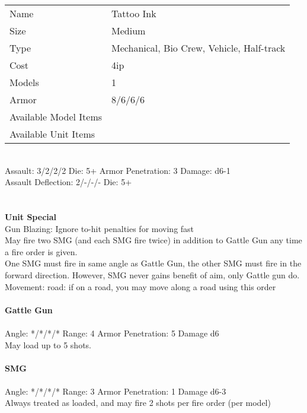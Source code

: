 \begin{tabular}{ll}
  Name & Tattoo Ink \\
  Size & Medium\\
  Type & Mechanical, Bio Crew, Vehicle, Half-track\\
  Cost & 4ip\\
  Models & 1\\
  Armor & 8/6/6/6\\
  Available Model Items &  \\
  Available Unit Items &  \\
\end{tabular}

\ \\
Assault: 3/2/2/2 Die: 5+ Armor Penetration: 3 Damage: d6-1 \\
Assault Deflection: 2/-/-/- Die: 5+\\
\indent  \\
\ \\

{\bf Unit Special} \\
Gun Blazing: Ignore to-hit penalties for moving fast\\ May fire two SMG (and each SMG fire twice) in addition to Gattle Gun any time a fire order is given.\\ One SMG must fire in same angle as Gattle Gun, the other SMG must fire in the forward direction. However, SMG never gains benefit of aim, only Gattle gun do.\\ Movement: road: if on a road, you may move along a road using this order
\ \\
\ \\
{\bf Gattle Gun } \\
\ \\
Angle: */*/*/* Range: 4 Armor Penetration: 5 Damage d6 \\
\indent May load up to 5 shots. \\



\ \\
{\bf SMG } \\
\ \\
Angle: */*/*/* Range: 3 Armor Penetration: 1 Damage d6-3 \\
\indent Always treated as loaded, and may fire 2 shots per fire order (per model) \\





